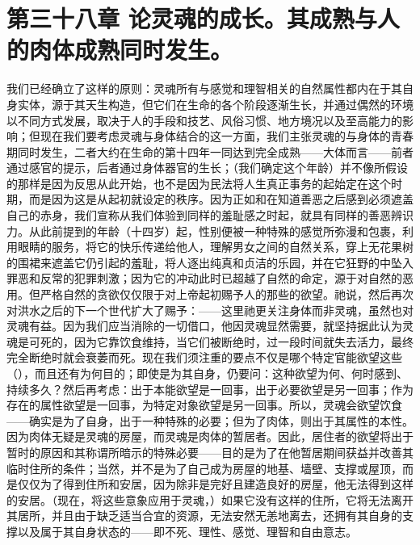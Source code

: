 
\section{第三十八章 论灵魂的成长。其成熟与人的肉体成熟同时发生。}

我们已经确立了这样的原则：灵魂所有与感觉和理智相关的自然属性都内在于其自身实体，源于其天生构造，但它们在生命的各个阶段逐渐生长，并通过偶然的环境以不同方式发展，取决于人的手段和技艺、风俗习惯、地方境况以及至高能力的影响；但现在我们要考虑灵魂与身体结合的这一方面，我们主张灵魂的与身体的青春期同时发生，二者大约在生命的第十四年一同达到完全成熟——大体而言——前者通过感官的提示，后者通过身体器官的生长；（我们确定这个年龄）并不像所假设的那样是因为反思从此开始，也不是因为民法将人生真正事务的起始定在这个时期，而是因为这是从起初就设定的秩序。因为正如和在知道善恶之后感到必须遮盖自己的赤身，我们宣称从我们体验到同样的羞耻感之时起，就具有同样的善恶辨识力。从此前提到的年龄（十四岁）起，性别便被一种特殊的感觉所弥漫和包裹，利用眼睛的服务，将它的快乐传递给他人，理解男女之间的自然关系，穿上无花果树的围裙来遮盖它仍引起的羞耻，将人逐出纯真和贞洁的乐园，并在它狂野的中坠入罪恶和反常的犯罪刺激；因为它的冲动此时已超越了自然的命定，源于对自然的恶用。但严格自然的贪欲仅仅限于对上帝起初赐予人的那些的欲望。祂说，然后再次对洪水之后的下一个世代扩大了赐予：——这里祂更关注身体而非灵魂，虽然也对灵魂有益。因为我们应当消除的一切借口，他因灵魂显然需要，就坚持据此认为灵魂是可死的，因为它靠饮食维持，当它们被断绝时，过一段时间就失去活力，最终完全断绝时就会衰萎而死。现在我们须注重的要点不仅是哪个特定官能欲望这些（），而且还有为何目的；即使是为其自身，仍要问：这种欲望为何、何时感到、持续多久？然后再考虑：出于本能欲望是一回事，出于必要欲望是另一回事；作为存在的属性欲望是一回事，为特定对象欲望是另一回事。所以，灵魂会欲望饮食——确实是为了自身，出于一种特殊的必要；但为了肉体，则出于其属性的本性。因为肉体无疑是灵魂的房屋，而灵魂是肉体的暂居者。因此，居住者的欲望将出于暂时的原因和其称谓所暗示的特殊必要——目的是为了在他暂居期间获益并改善其临时住所的条件；当然，并不是为了自己成为房屋的地基、墙壁、支撑或屋顶，而是仅仅为了得到住所和安居，因为除非是完好且建造良好的房屋，他无法得到这样的安居。（现在，将这些意象应用于灵魂，）如果它没有这样的住所，它将无法离开其居所，并且由于缺乏适当合宜的资源，无法安然无恙地离去，还拥有其自身的支撑以及属于其自身状态的——即不死、理性、感觉、理智和自由意志。\par


